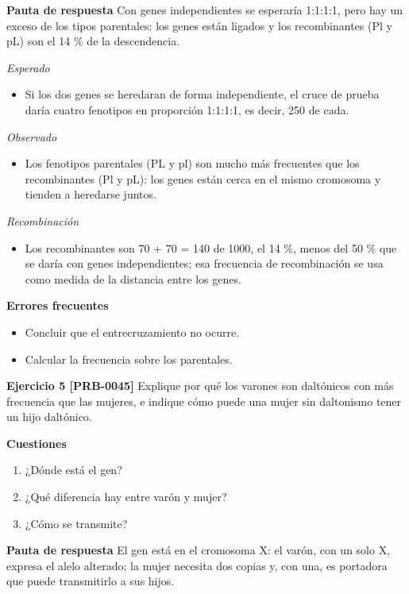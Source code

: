 \documentclass{book}
\begin{document}
\noindent\textbf{Pauta de respuesta}
Con genes independientes se esperaría 1:1:1:1, pero hay un exceso de los tipos parentales: los genes están ligados y los recombinantes (Pl y pL) son el 14 \% de la descendencia.


\noindent\textit{Esperado}
\begin{itemize}
\item Si los dos genes se heredaran de forma independiente, el cruce de prueba daría cuatro fenotipos en proporción 1:1:1:1, es decir, 250 de cada.
\end{itemize}

\noindent\textit{Observado}
\begin{itemize}
\item Los fenotipos parentales (PL y pl) son mucho más frecuentes que los recombinantes (Pl y pL): los genes están cerca en el mismo cromosoma y tienden a heredarse juntos.
\end{itemize}

\noindent\textit{Recombinación}
\begin{itemize}
\item Los recombinantes son 70 + 70 = 140 de 1000, el 14 \%, menos del 50 \% que se daría con genes independientes; esa frecuencia de recombinación se usa como medida de la distancia entre los genes.
\end{itemize}

\noindent\textbf{Errores frecuentes}
\begin{itemize}
\item Concluir que el entrecruzamiento no ocurre.
\item Calcular la frecuencia sobre los parentales.
\end{itemize}

\noindent\textbf{Ejercicio 5 [PRB-0045]}
Explique por qué los varones son daltónicos con más frecuencia que las mujeres, e indique cómo puede una mujer sin daltonismo tener un hijo daltónico.


\noindent\textbf{Cuestiones}
\begin{enumerate}
\item ¿Dónde está el gen?
\item ¿Qué diferencia hay entre varón y mujer?
\item ¿Cómo se transmite?
\end{enumerate}

\noindent\textbf{Pauta de respuesta}
El gen está en el cromosoma X: el varón, con un solo X, expresa el alelo alterado; la mujer necesita dos copias y, con una, es portadora que puede transmitirlo a sus hijos.
\end{document}
